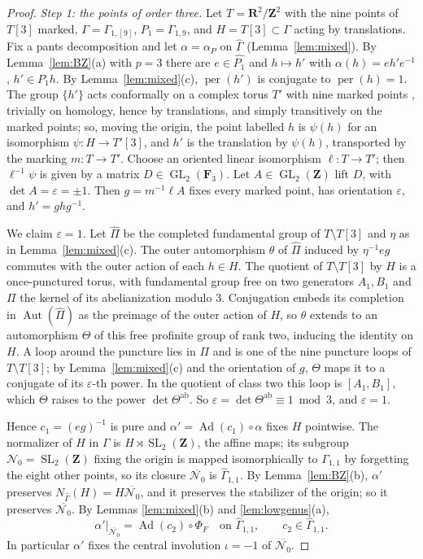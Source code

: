 \documentclass[11pt,a4paper]{article}
\theoremstyle{plain}
\theoremstyle{definition}
\theoremstyle{remark}
\newcommand{\Z}{\mathbf Z}
\newcommand{\F}{\mathbf F}
\newcommand{\Gh}{\widehat\Gamma}
\newcommand{\Ad}{\operatorname{Ad}}
\newcommand{\Aut}{\operatorname{Aut}}
\newcommand{\SL}{\operatorname{SL}}
\newcommand{\GL}{\operatorname{GL}}
\newcommand{\per}{\operatorname{per}}
\newcommand{\ab}{\mathrm{ab}}
\begin{document}
\begin{proof}
\emph{Step 1: the points of order three.} Let $T=\mathbf R^2/\Z^2$ with the nine points of $T[3]$ marked,
$\Gamma=\Gamma_{1,[9]}$, $P_1=\Gamma_{1,9}$, and $H=T[3]\subset\Gamma$ acting by translations. Fix a pants
decomposition and let $\alpha=\alpha_P$ on $\widehat\Gamma$ (Lemma~\ref{lem:mixed}). By Lemma~\ref{lem:BZ}(a) with
$p=3$ there are $e\in\widehat{P_1}$ and $h\mapsto h'$ with $\alpha(h)=eh'e^{-1}$, $h'\in P_1h$. By
Lemma~\ref{lem:mixed}(c), $\per(h')$ is conjugate to $\per(h)=1$. The group $\{h'\}$ acts conformally on a complex
torus $T'$ with nine marked points \cite{K}, trivially on homology, hence by translations, and simply transitively
on the marked points; so, moving the origin, the point labelled $h$ is $\psi(h)$ for an isomorphism
$\psi:H\to T'[3]$, and $h'$ is the translation by $\psi(h)$, transported by the marking $m:T\to T'$. Choose an
oriented linear isomorphism $\ell:T\to T'$; then $\ell^{-1}\psi$ is given by a matrix $D\in\GL_2(\F_3)$. Let
$A\in\GL_2(\Z)$ lift $D$, with $\det A=\varepsilon=\pm1$. Then $g=m^{-1}\ell A$ fixes every marked point, has
orientation $\varepsilon$, and $h'=ghg^{-1}$.

We claim $\varepsilon=1$. Let $\widehat\Pi$ be the completed fundamental group of $T\setminus T[3]$ and
$\eta$ as in Lemma~\ref{lem:mixed}(c). The outer automorphism $\theta$ of $\widehat\Pi$ induced by $\eta^{-1}eg$
commutes with the outer action of each $h\in H$. The quotient of $T\setminus T[3]$ by $H$ is a once-punctured
torus, with fundamental group free on two generators $A_1,B_1$ and $\Pi$ the kernel of its abelianization modulo
$3$. Conjugation embeds its completion in $\Aut(\widehat\Pi)$ as the preimage of the outer action of $H$, so
$\theta$ extends to an automorphism $\Theta$ of this free profinite group of rank two, inducing the identity on
$H$. A loop around the puncture lies in $\Pi$ and is one of the nine puncture loops of $T\setminus T[3]$; by
Lemma~\ref{lem:mixed}(c) and the orientation of $g$, $\Theta$ maps it to a conjugate of its $\varepsilon$-th
power. In the quotient of class two this loop is $[A_1,B_1]$, which $\Theta$ raises to the power $\det\Theta^{\ab}$.
So $\varepsilon=\det\Theta^{\ab}\equiv1\bmod3$, and $\varepsilon=1$.

Hence $c_1=(eg)^{-1}$ is pure and $\alpha'=\Ad(c_1)\circ\alpha$ fixes $H$ pointwise. The normalizer of $H$ in
$\Gamma$ is $H\rtimes\SL_2(\Z)$, the affine maps; its subgroup $\mathcal N_0=\SL_2(\Z)$ fixing the origin is mapped
isomorphically to $\Gamma_{1,1}$ by forgetting the eight other points, so its closure $\overline{\mathcal N_0}$ is
$\Gh_{1,1}$. By Lemma~\ref{lem:BZ}(b), $\alpha'$ preserves $N_{\widehat\Gamma}(H)=H\overline{\mathcal N_0}$, and it
preserves the stabilizer of the origin; so it preserves $\overline{\mathcal N_0}$. By Lemmas
\ref{lem:mixed}(b) and \ref{lem:lowgenus}(a),
\[
 \alpha'|_{\overline{\mathcal N_0}}=\Ad(c_2)\circ\Phi_F\quad\text{on }\Gh_{1,1},\qquad c_2\in\Gh_{1,1}.
\]
In particular $\alpha'$ fixes the central involution $\iota=-1$ of $\overline{\mathcal N_0}$.


\end{proof}
\end{document}
